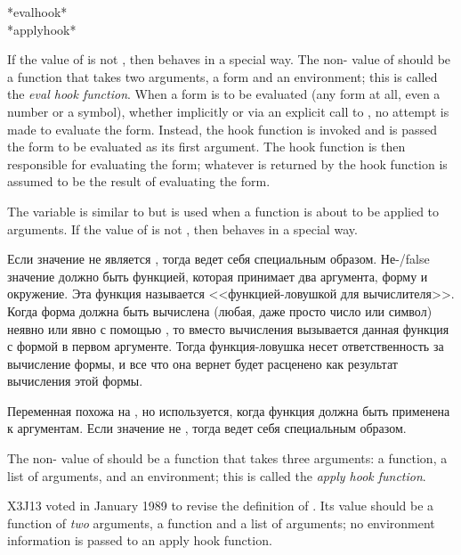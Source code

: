 \begin{defun}[Variable]
*evalhook* \\
*applyhook*

If the value of  is not {\false}, then  behaves
in a special way.  The non-{\false} value of  should be a function
that takes two arguments, a form and an environment;
this is called the \emph{eval hook function}.
When a form is to be evaluated (any form at all, even a number or a symbol),
whether implicitly or via an explicit call to , no attempt
is made to evaluate the form.
Instead, the hook function is invoked and is passed the form to be evaluated
as its first argument.  The hook function is then responsible for
evaluating the form; whatever is returned by the hook function is assumed
to be the result of evaluating the form.

The variable  is similar to  but is used
when a function is about to be applied to arguments.
If the value of  is not {\false}, then  behaves
in a special way.

Если значение  не является {\false}, тогда  ведет себя
специальным образом. Не-{/false} значение  должно быть функцией,
которая принимает два аргумента, форму и окружение.
Эта функция называется <<функцией-ловушкой для вычислителя>>.
Когда форма должна быть вычислена (любая, даже просто число или символ) неявно или явно с
помощью , то вместо вычисления вызывается данная функция с формой в
первом аргументе.
Тогда функция-ловушка несет ответственность за вычисление формы, и все что она
вернет будет расценено как результат вычисления этой формы.

Переменная  похожа на , но используется, когда
функция должна быть применена к аргументам.
Если значение  не {\false}, тогда  ведет себя
специальным образом.
\begin{obsolete}
The non-{\false} value of  should be a function
that takes three arguments: a function, a list of arguments,
and an environment;
this is called the \emph{apply hook function}.
\end{obsolete}

\begin{new}
X3J13 voted in January 1989
to revise the definition of .
Its value should be a function of \emph{two} arguments,
a function and a list of arguments; no environment information is passed
to an apply hook function.


\end{new}
\end{defun}
